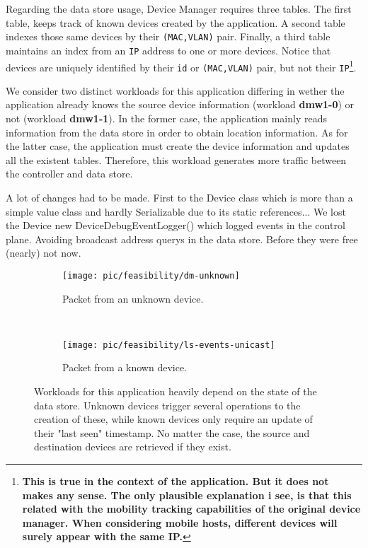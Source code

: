 \documentclass[12pt,openright,twoside]{report}
\begin{document}
Regarding the data store usage, Device Manager requires three
tables. The first table, keeps track 
of known devices created by the
application. A second table indexes those same devices by their
\texttt{(MAC,VLAN)} pair.  Finally, a third table maintains an index
from an \texttt{IP} address to one or more devices. Notice
that devices are uniquely identified by their \texttt{id} or \texttt{(MAC,VLAN)} pair, but not their \texttt{IP}\footnote{\textbf{This is true in the context of
  the application. But it does not makes any sense. The only plausible
explanation i see, is that this related with the mobility
tracking capabilities of the original device manager. When considering
mobile hosts, different devices will surely appear with the same
IP.} }.  

We consider two distinct workloads for this application differing in
wether the application already knows the source device information (workload \textbf{dmw1-0})
or not (workload \textbf{dmw1-1}). In the former case, the
application mainly reads information from the data store in order to
obtain location information. As for the latter case, the
application must create the device information and updates all the
existent tables. Therefore, this workload generates more traffic between
the controller and data store. 




A lot of changes had to be made. First to the Device class which is
more than a simple value class and hardly Serializable due to its
static references... 
We lost the Device new DeviceDebugEventLogger() which logged events in
the control plane. 
Avoiding broadcast address querys in the data store. Before they were
free (nearly) not now. 

\begin{figure}
  \centering
  \begin{subfigure}[b]{0.5\textwidth}
                \centering
                \texttt{[image: pic/feasibility/dm-unknown]}
                \caption{Packet from an unknown device.}
                \label{fig:dm:interaction:unknown}
        \end{subfigure}%
        ~
        \begin{subfigure}[b]{0.5\textwidth}
                \centering
                \texttt{[image: pic/feasibility/ls-events-unicast]}
                \caption{Packet from a known device.}
                \label{fig:dm:interaction:known}
        \end{subfigure}
        \caption[Device Manager workload events]{Workloads for this application heavily depend on the state of the data store. Unknown devices trigger several operations to the creation of these, while known devices only require an update of their "last seen" timestamp. No matter the case, the source and destination devices are retrieved if they exist.}
        \label{fig:dm:interaction}
\end{figure}
\end{document}
